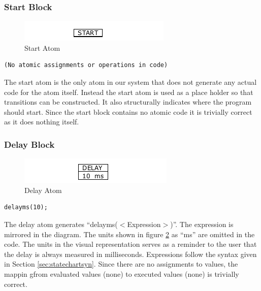 \subsubsection{Start Block}

\begin{figure}[h]
	\centering
	\includegraphics[width=\imgmedphoto]{./images/correctness_atom_start.png}
	\caption{Start Atom}
	\label{fig:correctness_atom_start}
\end{figure}

\begin{lstlisting}[frame=single]
(No atomic assignments or operations in code)
\end{lstlisting}

The start atom is the only atom in our system that does not generate any actual 
code for the atom itself. Instead the start atom is used as a place holder so that 
transitions can be constructed. It also structurally indicates where the program 
should start. Since the start block contains no atomic code it is trivially correct 
as it does nothing itself.


\subsubsection{Delay Block}

\begin{figure}[h]
	\centering
	\includegraphics[width=\imgmedphoto]{./images/correctness_atom_delay.png}
	\caption{Delay Atom}
	\label{fig:correctness_atom_delay}
\end{figure}

\begin{lstlisting}[frame=single]
delayms(10);
\end{lstlisting}

The delay atom generates ``delayms($<$Expression$>$)''. The expression is mirrored
in the diagram. The units shown in figure \ref{fig:correctness_atom_delay} as ``ms'' 
are omitted in the code. The units in the visual representation serves as a reminder to the user 
that the delay is always measured in milliseconds. Expressions follow the syntax 
given in Section \ref{sec:statechartsyn}. Since there are no assignments to values,
the mappin gfrom evaluated values (none) to executed values (none) is trivially correct.


